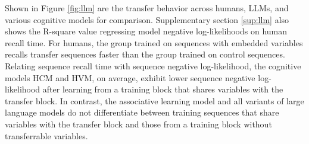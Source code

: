 \documentclass{article} %
\theoremstyle{remark}
\begin{document}

Shown in Figure \ref{fig:llm} are the transfer behavior across humans, LLMs, and various cognitive models for comparison. Supplementary section \ref{sup:llm} also shows the R-square value regressing model negative log-likelihoods on human recall time. For humans, the group trained on sequences with embedded variables recalls transfer sequences faster than the group trained on control sequences. Relating sequence recall time with sequence negative log-likelihood, the cognitive models HCM and HVM, on average, exhibit lower sequence negative log-likelihood after learning from a training block that shares variables with the transfer block. In contrast, the associative learning model and all variants of large language models do not differentiate between training sequences that share variables with the transfer block and those from a training block without transferrable variables. 

\end{document}
